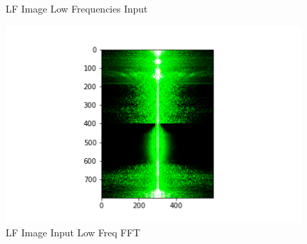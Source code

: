 \documentclass{article}
\begin{document}
\begin{figure}[!htb]
    \caption{LF Image Low Frequencies Input}\label{fig:awesome_image2}
\endminipage
{}
    \includegraphics[width=\linewidth]{cat fourier.png}
    \caption{LF Image Input Low Freq FFT}\label{fig:awesome_image2}
\endminipage
\end{figure}
\end{document}

